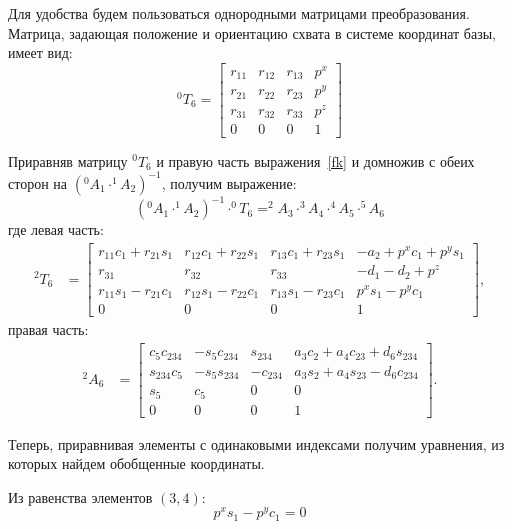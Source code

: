 Для удобства будем пользоваться однородными матрицами преобразования.
Матрица, задающая положение и ориентацию схвата в системе координат базы, имеет вид:
\begin{equation}\label{ik}
	^0T_6 =
	\left[\begin{matrix}
	r_{11} & r_{12} & r_{13} & p^{x}\\
	r_{21} & r_{22} & r_{23} & p^{y}\\
	r_{31} & r_{32} & r_{33} & p^{z}\\
	0 & 0 & 0 & 1
	\end{matrix}\right]
\end{equation}

Приравняв матрицу $^0T_6$ и правую часть выражения~\eqref{fk} и домножив с обеих сторон на $(^0A_1 \cdot ^1A_2)^{-1}$, получим выражение:
\begin{equation}
	(^0A_1 \cdot ^1A_2)^{-1} \cdot ^0T_6 = ^2A_3 \cdot ^3A_4 \cdot ^4A_5 \cdot ^5A_6
\end{equation}
где левая часть:
\begin{align*}
	^2T_6 &= 
	\left[\begin{matrix}
		r_{11} c_{1} + r_{21} s_{1} & r_{12} c_{1} + r_{22} s_{1} & r_{13} c_{1} + r_{23} s_{1} & - a_{2} + p^{x} c_{1} + p^{y} s_{1}\\
		r_{31} & r_{32} & r_{33} & - d_{1} - d_{2} + p^{z}\\
		r_{11} s_{1} - r_{21} c_{1} & r_{12} s_{1} - r_{22} c_{1} & r_{13} s_{1} - r_{23} c_{1} & p^{x} s_{1} - p^{y} c_{1}\\
		0 & 0 & 0 & 1\end{matrix}\right],
\end{align*}
правая часть:
\begin{align*}
	^2A_6 &=
	\left[\begin{matrix}
		c_{5} c_{234} & - s_{5} c_{234} & s_{234} & a_{3} c_{2} + a_{4} c_{23} + d_{6} s_{234}\\
		s_{234} c_{5} & - s_{5} s_{234} & - c_{234} & a_{3} s_{2} + a_{4} s_{23} - d_{6} c_{234}\\
		s_{5} & c_{5} & 0 & 0\\
		0 & 0 & 0 & 1
	\end{matrix}\right].
\end{align*}

Теперь, приравнивая элементы с одинаковыми индексами получим уравнения, из которых найдем обобщенные координаты.

Из равенства элементов $(3,4)$: 
\begin{equation}
	p^{x} s_{1} - p^{y} c_{1} = 0
\end{equation}

